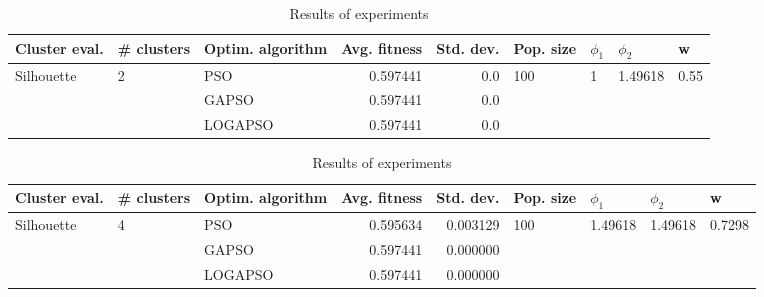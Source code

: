 \documentclass{article}
\begin{document}
\begin{table}
\centering
\caption{Results of experiments}
\begin{tabular}{lllrrllll}
\toprule
              Cluster eval. &        \# clusters & Optim. algorithm &  Avg. fitness &  Std. dev. &            Pop. size &         $\phi_{1}$ &               $\phi_{2}$ &                     w \\
\midrule
\multirow{3}{*}{Silhouette} & \multirow{3}{*}{2} &              PSO &      0.597441 &        0.0 & \multirow{3}{*}{100} & \multirow{3}{*}{1} & \multirow{3}{*}{1.49618} & \multirow{3}{*}{0.55} \\
                            &                    &            GAPSO &      0.597441 &        0.0 &                      &                    &                          &                       \\
                            &                    &          LOGAPSO &      0.597441 &        0.0 &                      &                    &                          &                       \\
\bottomrule
\end{tabular}
\end{table}
\begin{table}
\centering
\caption{Results of experiments}
\begin{tabular}{lllrrllll}
\toprule
              Cluster eval. &        \# clusters & Optim. algorithm &  Avg. fitness &  Std. dev. &            Pop. size &               $\phi_{1}$ &               $\phi_{2}$ &                       w \\
\midrule
\multirow{3}{*}{Silhouette} & \multirow{3}{*}{4} &              PSO &      0.595634 &   0.003129 & \multirow{3}{*}{100} & \multirow{3}{*}{1.49618} & \multirow{3}{*}{1.49618} & \multirow{3}{*}{0.7298} \\
                            &                    &            GAPSO &      0.597441 &   0.000000 &                      &                          &                          &                         \\
                            &                    &          LOGAPSO &      0.597441 &   0.000000 &                      &                          &                          &                         \\
\bottomrule
\end{tabular}
\end{table}
\end{document}

